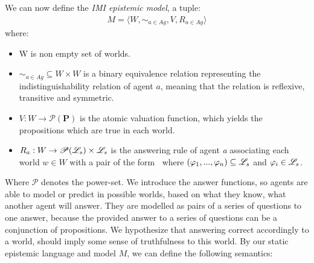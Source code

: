 We can now define the \textit{IMI epistemic model}, a tuple:
\begin{align}
    M = \langle W, \sim_{a\in Ag}, V, R_{a\in Ag}\rangle \label{eq:3}
\end{align}
where:
\begin{itemize}
    \setlength\itemsep{-0.4em}
    \item W is non empty set of worlds.
    \item $\sim_{a\in Ag} \subseteq W \times W$ is a binary equivalence relation representing the indistinguishability relation of agent $a$, meaning that the relation is reflexive, transitive and symmetric.
    \item $V : W \rightarrow \mathscr{P}(\mathbf{P})$ is the atomic valuation function, which yields the propositions which are true in each world.
    \item $R_a : W \rightarrow \mathscr{P}(\mathscr{L}_s) \times \mathscr{L}_s$ is the answering \newline rule of agent \textit{a} associating each world $w \in W$ with a pair of the form \aset $\:$ where $(\varphi_1,...,\varphi_n) \subseteq \mathscr{L}_s$ and $\varphi_i \in \mathscr{L}_s$.
\end{itemize}
Where $\mathscr{P}$ denotes the power-set. We introduce the answer functions, so agents are able to model or predict in possible worlds, based on what they know, what another agent will answer. They are modelled as pairs of a series of questions to one answer, because the provided answer to a series of questions can be a conjunction of propositions. We hypothesize that answering correct accordingly to a world, should imply some sense of truthfulness to this world. By our static epistemic language \staticlang\: and model $M$, we can define the following semantics:

